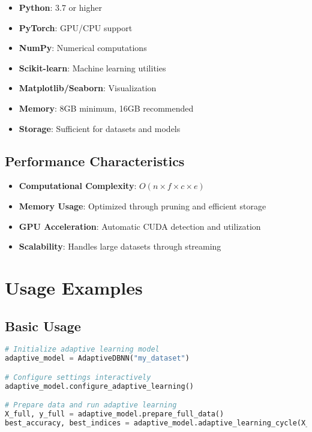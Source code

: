 \documentclass[11pt]{article}
\begin{document}
\begin{itemize}
\item \textbf{Python}: 3.7 or higher
\item \textbf{PyTorch}: GPU/CPU support
\item \textbf{NumPy}: Numerical computations
\item \textbf{Scikit-learn}: Machine learning utilities
\item \textbf{Matplotlib/Seaborn}: Visualization
\item \textbf{Memory}: 8GB minimum, 16GB recommended
\item \textbf{Storage}: Sufficient for datasets and models
\end{itemize}

\subsection{Performance Characteristics}

\begin{itemize}
\item \textbf{Computational Complexity}: $O(n \times f \times c \times e)$
\item \textbf{Memory Usage}: Optimized through pruning and efficient storage
\item \textbf{GPU Acceleration}: Automatic CUDA detection and utilization
\item \textbf{Scalability}: Handles large datasets through streaming
\end{itemize}

\section{Usage Examples}

\subsection{Basic Usage}

\begin{lstlisting}[language=Python]
# Initialize adaptive learning model
adaptive_model = AdaptiveDBNN("my_dataset")

# Configure settings interactively
adaptive_model.configure_adaptive_learning()

# Prepare data and run adaptive learning
X_full, y_full = adaptive_model.prepare_full_data()
best_accuracy, best_indices = adaptive_model.adaptive_learning_cycle(X_full, y_full)
\end{lstlisting}
\end{document}
